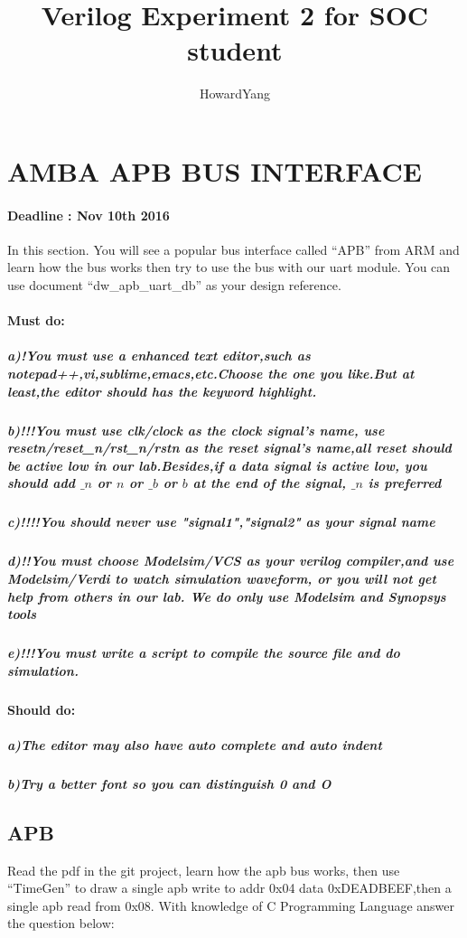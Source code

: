 \documentclass{article}
\author{HowardYang}
\title{Verilog Experiment 2 for SOC student}
\begin{document}
\maketitle
\newpage{}
\section{AMBA APB BUS INTERFACE}
\paragraph{Deadline : Nov 10th 2016\\}
In this section. You will see a popular bus interface called ``APB'' from ARM and learn how the bus works then try to use the bus with our uart module. You can use document ``dw\_apb\_uart\_db'' as your design reference.
\paragraph{Must do:}
\subparagraph {a)!You must use a enhanced text editor,such as notepad++,vi,sublime,emacs,etc.Choose the one you like.But at least,the editor should has the keyword highlight.}
\subparagraph {b)!!!You must use clk/clock as the clock signal's name, use resetn/reset\_n/rst\_n/rstn as the reset signal's name,all reset should be active low in our lab.Besides,if a data signal is active low, you should add $\_n$ or $n$ or $\_b$ or $b$ at the end of the signal, $\_n$ is preferred}
\subparagraph {c)!!!!You should never use "signal1","signal2" as your signal name}
\subparagraph {d)!!You must choose Modelsim/VCS as your verilog compiler,and use Modelsim/Verdi to watch simulation waveform, or you will not get help from others in our lab. We do only use Modelsim and Synopsys tools}
\subparagraph {e)!!!You must write a script to compile the source file and do simulation.}
\paragraph{Should do:}
\subparagraph {a)The editor may also have auto complete and auto indent}
\subparagraph {b)Try a better font so you can distinguish 0 and O}
\subsection{APB}
Read the pdf in the git project, learn how the apb bus works,
then use ``TimeGen'' to draw a single apb write to addr 0x04 data 0xDEADBEEF,then a single apb read from 0x08.
With knowledge of C Programming Language answer the question below:\\
\end{document}
